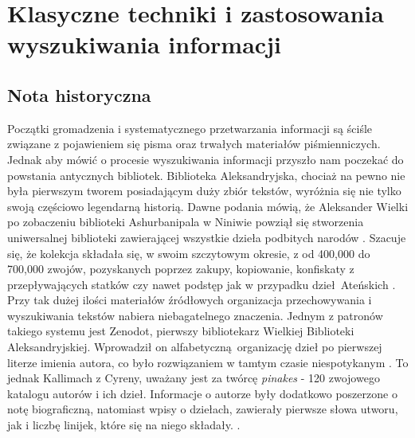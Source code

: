\chapter{Klasyczne techniki i zastosowania wyszukiwania informacji}
\label{chap:pierwszy}

\section{Nota historyczna}


Początki gromadzenia i systematycznego przetwarzania informacji są ściśle związane z pojawieniem się pisma oraz trwałych materiałów piśmienniczych. Jednak aby mówić o procesie wyszukiwania informacji przyszło nam poczekać do powstania antycznych bibliotek. Biblioteka Aleksandryjska, chociaż na pewno nie była pierwszym tworem posiadającym duży zbiór tekstów, wyróżnia się nie tylko swoją częściowo legendarną historią. Dawne podania mówią, że Aleksander Wielki po zobaczeniu biblioteki Ashurbanipala w Niniwie powziął się stworzenia uniwersalnej biblioteki zawierającej wszystkie dzieła podbitych narodów \autocite{phillips2010}. Szacuje się, że kolekcja składała się, w swoim szczytowym okresie, z od 400,000 do 700,000 zwojów, pozyskanych poprzez zakupy, kopiowanie, konfiskaty z przepływających statków czy nawet podstęp jak w przypadku dzieł Ateńskich  \autocite{phillips2010}. Przy tak dużej ilości materiałów źródłowych organizacja przechowywania i wyszukiwania tekstów nabiera niebagatelnego znaczenia. Jednym z patronów takiego systemu jest Zenodot, pierwszy bibliotekarz Wielkiej Biblioteki Aleksandryjskiej. Wprowadził on alfabetyczną organizację dzieł po pierwszej literze imienia autora, co było rozwiązaniem w tamtym czasie niespotykanym \autocite{phillips2010}. To jednak Kallimach z Cyreny, uważany jest za twórcę \textit{pinakes} - 120 zwojowego katalogu autorów i ich dzieł. Informacje o autorze były dodatkowo poszerzone o notę biograficzną, natomiast wpisy o dziełach, zawierały pierwsze słowa utworu, jak i liczbę linijek, które się na niego składały. \autocite{phillips2010}. \newline


